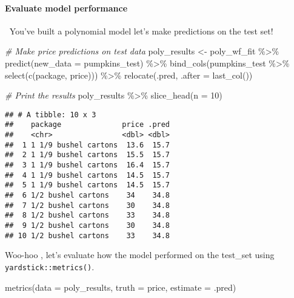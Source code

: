 \documentclass[
]{article}
\newenvironment{Shaded}{\begin{snugshade}}{\end{snugshade}}
\newcommand{\AttributeTok}[1]{\textcolor[rgb]{0.77,0.63,0.00}{#1}}
\newcommand{\CommentTok}[1]{\textcolor[rgb]{0.56,0.35,0.01}{\textit{#1}}}
\newcommand{\DecValTok}[1]{\textcolor[rgb]{0.00,0.00,0.81}{#1}}
\newcommand{\FunctionTok}[1]{\textcolor[rgb]{0.00,0.00,0.00}{#1}}
\newcommand{\NormalTok}[1]{#1}
\newcommand{\OtherTok}[1]{\textcolor[rgb]{0.56,0.35,0.01}{#1}}
\newcommand{\SpecialCharTok}[1]{\textcolor[rgb]{0.00,0.00,0.00}{#1}}
\begin{document}
\hypertarget{evaluate-model-performance}{%
\paragraph{Evaluate model
performance}\label{evaluate-model-performance}}

👏👏You've built a polynomial model let's make predictions on the test
set!

\begin{Shaded}
\begin{Highlighting}[]
\CommentTok{\# Make price predictions on test data}
\NormalTok{poly\_results }\OtherTok{\textless{}{-}}\NormalTok{ poly\_wf\_fit }\SpecialCharTok{\%\textgreater{}\%} \FunctionTok{predict}\NormalTok{(}\AttributeTok{new\_data =}\NormalTok{ pumpkins\_test) }\SpecialCharTok{\%\textgreater{}\%} 
  \FunctionTok{bind\_cols}\NormalTok{(pumpkins\_test }\SpecialCharTok{\%\textgreater{}\%} \FunctionTok{select}\NormalTok{(}\FunctionTok{c}\NormalTok{(package, price))) }\SpecialCharTok{\%\textgreater{}\%} 
  \FunctionTok{relocate}\NormalTok{(.pred, }\AttributeTok{.after =} \FunctionTok{last\_col}\NormalTok{())}


\CommentTok{\# Print the results}
\NormalTok{poly\_results }\SpecialCharTok{\%\textgreater{}\%} 
  \FunctionTok{slice\_head}\NormalTok{(}\AttributeTok{n =} \DecValTok{10}\NormalTok{)}
\end{Highlighting}
\end{Shaded}

\begin{verbatim}
## # A tibble: 10 x 3
##    package              price .pred
##    <chr>                <dbl> <dbl>
##  1 1 1/9 bushel cartons  13.6  15.7
##  2 1 1/9 bushel cartons  15.5  15.7
##  3 1 1/9 bushel cartons  16.4  15.7
##  4 1 1/9 bushel cartons  14.5  15.7
##  5 1 1/9 bushel cartons  14.5  15.7
##  6 1/2 bushel cartons    34    34.8
##  7 1/2 bushel cartons    30    34.8
##  8 1/2 bushel cartons    33    34.8
##  9 1/2 bushel cartons    30    34.8
## 10 1/2 bushel cartons    33    34.8
\end{verbatim}

Woo-hoo , let's evaluate how the model performed on the test\_set using
\texttt{yardstick::metrics()}.

\begin{Shaded}
\begin{Highlighting}[]
\FunctionTok{metrics}\NormalTok{(}\AttributeTok{data =}\NormalTok{ poly\_results, }\AttributeTok{truth =}\NormalTok{ price, }\AttributeTok{estimate =}\NormalTok{ .pred)}
\end{Highlighting}
\end{Shaded}
\end{document}
